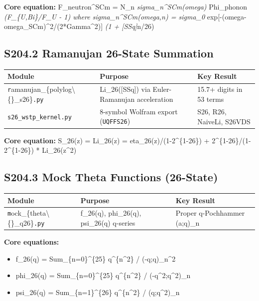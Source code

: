 \documentclass[11pt]{article}
\begin{document}
\textbf{Core equation:} F\_neutron\textasciicircum{}SCm = N\_n \emph{ sigma\_n\textasciicircum{}SCm(omega) } Phi\_phonon \emph{ (F\_\{U,Bi\}/F\_U - 1) where sigma\_n\textasciicircum{}SCm(omega,n) = sigma\_0 } exp[-(omega-omega\_SCm)\textasciicircum{}2/(2*Gamma\textasciicircum{}2)] \emph{ (1 + [SSq]}n/26)

\subsection*{S204.2 Ramanujan 26-State Summation}

\begin{center}
\begin{longtable}{lll}
\toprule
Module & Purpose & Key Result \tabularnewline
\midrule
\endhead
\verb|r|amanujan\_\{polylog\textbackslash\{\}\_s26\}\verb|.py| & Li\_26([SSq]) via Euler-Ramanujan acceleration & 15.7+ digits in 53 terms \tabularnewline
\verb|s26_wstp_kernel.py| & 8-symbol Wolfram export (\verb|UQFFS26|) & S26, R26, NaiveLi, S26VDS \tabularnewline
\bottomrule
\end{longtable}
\end{center}

\textbf{Core equation:} S\_26(z) = Li\_26(z) = eta\_26(z)/(1-2\textasciicircum{}\{1-26\}) + 2\textasciicircum{}\{1-26\}/(1-2\textasciicircum{}\{1-26\}) * Li\_26(z\textasciicircum{}2)

\subsection*{S204.3 Mock Theta Functions (26-State)}

\begin{center}
\begin{longtable}{lll}
\toprule
Module & Purpose & Key Result \tabularnewline
\midrule
\endhead
\verb|m|ock\_\{theta\textbackslash\{\}\_q26\}\verb|.py| & f\_26(q), phi\_26(q), psi\_26(q) q-series & Proper q-Pochhammer (a;q)\_n \tabularnewline
\bottomrule
\end{longtable}
\end{center}

\textbf{Core equations:}

\begin{itemize}
  \item f\_26(q) = Sum\_\{n=0\}\textasciicircum{}\{25\} q\textasciicircum{}\{n\textasciicircum{}2\} / (-q;q)\_n\textasciicircum{}2
  \item phi\_26(q) = Sum\_\{n=0\}\textasciicircum{}\{25\} q\textasciicircum{}\{n\textasciicircum{}2\} / (-q\textasciicircum{}2;q\textasciicircum{}2)\_n
  \item psi\_26(q) = Sum\_\{n=1\}\textasciicircum{}\{26\} q\textasciicircum{}\{n\textasciicircum{}2\} / (q;q\textasciicircum{}2)\_n
\end{itemize}
\end{document}
